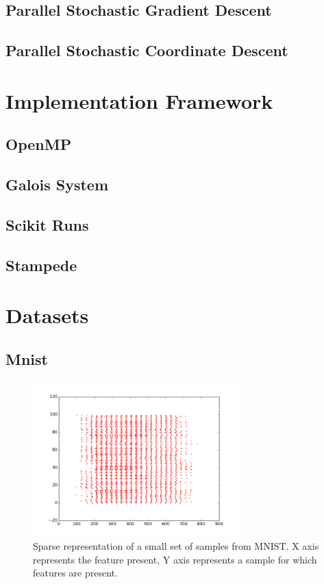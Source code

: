 \documentclass{sigplanconf}
\begin{document}
\subsection{Parallel Stochastic Gradient Descent}
\subsection{Parallel Stochastic Coordinate Descent}

\section{Implementation Framework}
\subsection{OpenMP}
\subsection{Galois System}
\subsection{Scikit Runs}
\subsection{Stampede}

\section{Datasets}
\subsection{Mnist}
\begin{figure}[ht!]
\centering
\includegraphics[width=80mm]{mnist_scatter.png}
\caption{Sparse representation of a small set of samples from MNIST. X axis represents the feature present, Y axis represents a sample for which features are present. }
\label{overflow}
\end{figure}
\end{document}
